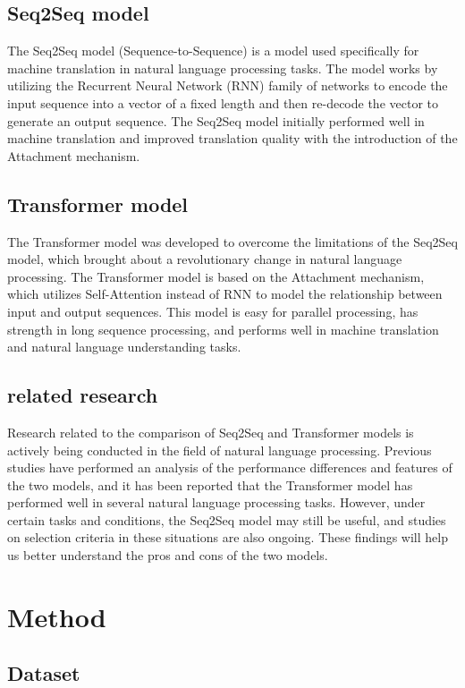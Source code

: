 \documentclass{article}
\begin{document}
\subsection{Seq2Seq model}

The Seq2Seq model (Sequence-to-Sequence) is a model used specifically for machine translation in natural language processing tasks. The model works by utilizing the Recurrent Neural Network (RNN) family of networks to encode the input sequence into a vector of a fixed length and then re-decode the vector to generate an output sequence. The Seq2Seq model initially performed well in machine translation and improved translation quality with the introduction of the Attachment mechanism.

\subsection{Transformer model}

The Transformer model was developed to overcome the limitations of the Seq2Seq model, which brought about a revolutionary change in natural language processing. The Transformer model is based on the Attachment mechanism, which utilizes Self-Attention instead of RNN to model the relationship between input and output sequences. This model is easy for parallel processing, has strength in long sequence processing, and performs well in machine translation and natural language understanding tasks.

\subsection{related research}

Research related to the comparison of Seq2Seq and Transformer models is actively being conducted in the field of natural language processing. Previous studies have performed an analysis of the performance differences and features of the two models, and it has been reported that the Transformer model has performed well in several natural language processing tasks. However, under certain tasks and conditions, the Seq2Seq model may still be useful, and studies on selection criteria in these situations are also ongoing. These findings will help us better understand the pros and cons of the two models.

\section{Method}
\subsection{Dataset}
\end{document}
